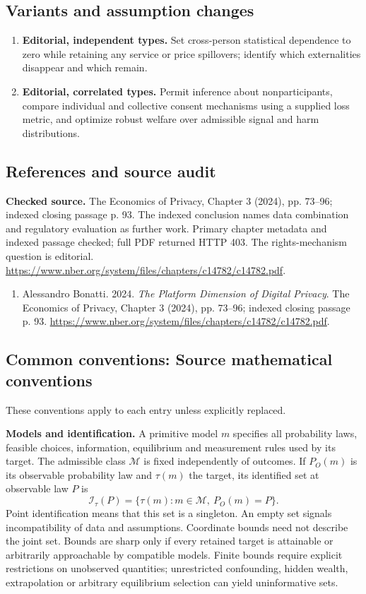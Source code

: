 \documentclass[11pt,a4paper]{article}
\begin{document}
\subsection*{Variants and assumption changes}
\begin{enumerate}
\item \textbf{Editorial, independent types.} Set cross-person statistical dependence to zero while retaining any service or price spillovers; identify which externalities disappear and which remain.
\item \textbf{Editorial, correlated types.} Permit inference about nonparticipants, compare individual and collective consent mechanisms using a supplied loss metric, and optimize robust welfare over admissible signal and harm distributions.
\end{enumerate}
\subsection*{References and source audit}
\textbf{Checked source.} The Economics of Privacy, Chapter 3 (2024), pp. 73--96; indexed closing passage p. 93. The indexed conclusion names data combination and regulatory evaluation as further work. Primary chapter metadata and indexed passage checked; full PDF returned HTTP 403. The rights-mechanism question is editorial. \url{https://www.nber.org/system/files/chapters/c14782/c14782.pdf}.
\begin{enumerate}\raggedright
\item\hypertarget{definitions:source:30007689:1}{} Alessandro Bonatti. 2024. \emph{The Platform Dimension of Digital Privacy}. The Economics of Privacy, Chapter 3 (2024), pp. 73--96; indexed closing passage p. 93.
\url{https://www.nber.org/system/files/chapters/c14782/c14782.pdf}.
\end{enumerate}

\subsection*{Common conventions: Source mathematical conventions}

These conventions apply to each entry unless explicitly replaced.

\textbf{Models and identification.} A primitive model \(m\) specifies all probability laws, feasible choices, information, equilibrium and measurement rules used by its target. The admissible class \(\mathcal M\) is fixed independently of outcomes. If \(P_O(m)\) is its observable probability law and \(\tau(m)\) the target, its identified set at observable law \(P\) is
\[
 \mathcal I_\tau(P)=\{\tau(m):m\in\mathcal M,\ P_O(m)=P\}.
\]
Point identification means that this set is a singleton. An empty set signals incompatibility of data and assumptions. Coordinate bounds need not describe the joint set. Bounds are sharp only if every retained target is attainable or arbitrarily approachable by compatible models. Finite bounds require explicit restrictions on unobserved quantities; unrestricted confounding, hidden wealth, extrapolation or arbitrary equilibrium selection can yield uninformative sets.
\end{document}
